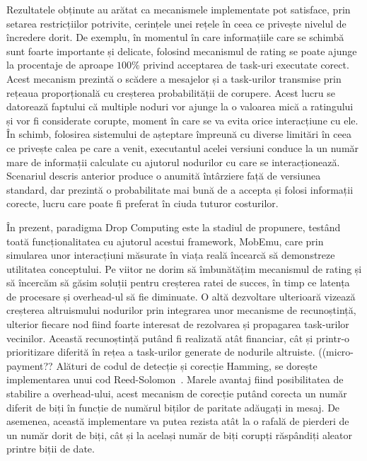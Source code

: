 \documentclass[12pt,a4paper]{report}
\begin{document}
Rezultatele obținute au arătat ca mecanismele implementate pot satisface, prin setarea restricțiilor potrivite, cerințele unei rețele în ceea ce privește nivelul de încredere dorit. De exemplu, în momentul în care informațiile care se schimbă sunt foarte importante și delicate, folosind mecanismul de rating se poate ajunge la procentaje de aproape $100\%$ privind acceptarea de task-uri executate corect. Acest mecanism prezintă o scădere a mesajelor și a task-urilor transmise prin rețeaua proporțională cu creșterea probabilității de corupere. Acest lucru se datorează faptului că multiple noduri vor ajunge la o valoarea mică a ratingului și vor fi considerate corupte, moment în care se va evita orice interacțiune cu ele. În schimb, folosirea sistemului de așteptare împreună cu diverse limitări în ceea ce privește calea pe care a venit, executantul acelei versiuni conduce la un număr mare de informații calculate cu ajutorul nodurilor cu care se interacționează. Scenariul descris anterior produce o anumită întârziere față de versiunea standard, dar prezintă o probabilitate mai bună de a accepta și folosi informații corecte, lucru care poate fi preferat în ciuda tuturor costurilor.

În prezent, paradigma Drop Computing este la stadiul de propunere, testând toată funcționalitatea cu ajutorul acestui framework, MobEmu, care prin simularea unor interacțiuni măsurate în viața reală încearcă să demonstreze utilitatea conceptului. Pe viitor ne dorim să îmbunătățim mecanismul de rating și să încercăm să găsim soluții pentru creșterea ratei de succes, în timp ce latența de procesare și overhead-ul să fie diminuate. O altă dezvoltare ulterioară vizează creșterea altruismului nodurilor prin integrarea unor mecanisme de recunoștință, ulterior fiecare nod fiind foarte interesat de rezolvarea și propagarea task-urilor vecinilor. Această recunoștință putând fi realizată atât financiar, cât și printr-o prioritizare diferită în rețea a task-urilor generate de nodurile altruiste. ((micro-payment??
Alături de codul de detecție și corecție Hamming, se dorește implementarea unui cod Reed-Solomon~\cite{reedSolomon}. Marele avantaj fiind posibilitatea de stabilire a overhead-ului, acest mecanism de corecție putând corecta un număr diferit de biți în funcție de numărul biților de paritate adăugați in mesaj. De asemenea, această implementare va putea rezista atât la o rafală de pierderi de un număr dorit de biți, cât și la același număr de biți corupți răspândiți aleator printre biții de date.

\end{document}
